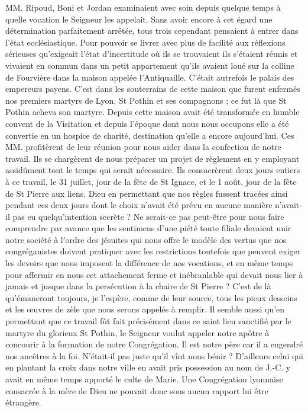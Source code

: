 MM. Ripoud, Boni et Jordan examinaient avec soin depuis quelque temps à quelle vocation le Seigneur les appelait. Sans avoir encore à cet égard une détermination parfaitement arrêtée, tous trois cependant pensaient à entrer dans l'état ecclésiastique. Pour pouvoir se livrer avec plus de facilité aux réflexions sérieuses qu'exigeait l'état d'incertitude où ils se trouvaient ils s'étaient réunis et vivaient en commun dans un petit appartement qu'ils avaient loué sur la colline de Fourvière dans la maison appelée l'Antiquaille. C'était autrefois le palais des empereurs payens. C'est dans les souterrains de cette maison que furent enfermés nos premiers martyrs de Lyon, St Pothin et ses compagnons ; ce fut là que St Pothin acheva son martyre. Depuis cette maison avait été transformée en humble couvent de la Visitation et depuis l'époque dont nous nous occupons elle a été convertie en un hospice de charité, destination qu'elle a encore aujourd'hui. Ces MM. profitèrent de leur réunion pour nous aider dans la confection de notre travail. Ils se chargèrent de nous préparer un projet de règlement en y employant assidûment tout le temps qui serait nécessaire. Ils consacrèrent deux jours entiers à ce travail, le 31 juillet, jour de la fête de St Ignace,
et le 1 août, jour de la fête de St Pierre aux liens. Dieu en permettant que nos règles fussent tracées ainsi pendant ces deux jours dont le choix n'avait été prévu en aucune manière n'avait-il pas eu quelqu'intention secrète ? Ne serait-ce pas peut-être pour nous faire comprendre par avance que les sentimens d'une piété toute filiale devaient unir notre société à l'ordre des jésuites qui nous offre le modèle des vertus que nos congréganistes doivent pratiquer avec les restrictions toutefois que peuvent exiger les devoirs que nous imposent la différence de nos vocations, et en même temps pour affermir en nous cet attachement ferme et inébranlable qui devait nous lier à jamais et jusque dans la persécution à la chaire de St Pierre ? C'est de là qu'émaneront toujours, je l'espère, comme de leur source, tous les pieux desseins et les œuvres de zèle que nous serons appelés à remplir. Il semble aussi qu'en permettant que ce travail fût fait précisément dans ce saint lieu sanctifié par le martyre du glorieux St Pothin, le Seigneur voulut appeler notre apôtre à concourir à la formation de notre Congrégation. Il est notre père car il a engendré nos ancêtres à la foi. N'était-il pas juste qu'il vînt nous bénir ? D'ailleurs celui qui en plantant la croix dans notre ville en avait pris possession au nom de J.-C. y avait en même temps apporté le culte de Marie. Une Congrégation lyonnaise consacrée à la mère de Dieu ne pouvait donc sous aucun rapport lui être étrangère.


